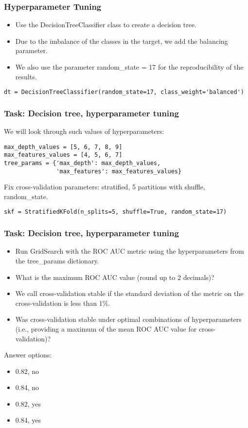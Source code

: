 \begin{frame}[fragile]\frametitle{Hyperparameter Tuning}
\begin{itemize}
\item Use the DecisionTreeClassifier class to create a decision tree. 
\item Due to the imbalance of the classes in the target, we add the balancing parameter. 
\item We also use the parameter random\_state = 17 for the reproducibility of the results.
\end{itemize}

\begin{lstlisting}
dt = DecisionTreeClassifier(random_state=17, class_weight='balanced')
\end{lstlisting}
\end{frame}

\begin{frame}[fragile]\frametitle{Task: Decision tree, hyperparameter tuning}
We will look through such values of hyperparameters:

\begin{lstlisting}
max_depth_values = [5, 6, 7, 8, 9]
max_features_values = [4, 5, 6, 7]
tree_params = {'max_depth': max_depth_values,
               'max_features': max_features_values}
\end{lstlisting}

Fix cross-validation parameters: stratified, 5 partitions with shuffle, random\_state.
\begin{lstlisting}
skf = StratifiedKFold(n_splits=5, shuffle=True, random_state=17)
\end{lstlisting}

\end{frame}

\begin{frame}[fragile]\frametitle{Task: Decision tree, hyperparameter tuning}
\begin{itemize}
\item Run GridSearch with the ROC AUC metric using the hyperparameters from the tree\_params dictionary. \item What is the maximum ROC AUC value (round up to 2 decimals)? 
\item We call cross-validation stable if the standard deviation of the metric on the cross-validation is less than 1\%. 
\item Was cross-validation stable under optimal combinations of hyperparameters (i.e., providing a maximum of the mean ROC AUC value for cross-validation)?
\end{itemize}

Answer options:

\begin{itemize}
\item 0.82, no
\item 0.84, no
\item 0.82, yes
\item 0.84, yes
\end{itemize}
\end{frame}

